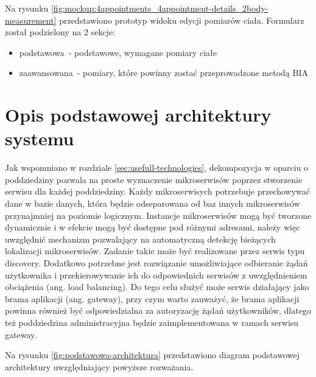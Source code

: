 


Na rysunku \ref{fig:mockup:4appointments_4appointment-details_2body-measurement} przedstawiono prototyp widoku edycji pomiarów ciała.
Formularz został podzielony na 2 sekcje:
\begin{itemize}
    \item podstawowa~- podstawowe, wymagane pomiary ciałe
    \item zaawansowana~- pomiary, które powinny zostać przeprowadzone metodą BIA
\end{itemize}



\section{Opis podstawowej architektury systemu}\label{sec:basicArchitecture}

Jak wspomniano w rozdziale \ref{sec:usefull-technologies}, dekompozycja w oparciu o poddziedziny
pozwala na proste wyznaczenie mikroserwisów poprzez stworzenie serwisu dla każdej poddziedziny.
Każdy mikroserwisych potrzebuje przechowywać dane w bazie danych, która będzie odseparowana od baz innych mikroserwisów przynajmniej na poziomie logicznym.
Instancje mikroserwisów mogą być tworzone dynamicznie i w efekcie mogą być dostępne pod różnymi adresami,
należy więc uwzględnić mechanizm pozwalający na automatyczną detekcję bieżących lokalizacji mikroserwisów.
Zadanie takie może być realizowane przez serwis typu discovery.
Dodatkowo potrzebne jest rozwiązanie umożliwiające odbieranie żądań użytkownika i przekierowywanie ich do odpowiednich serwisów z uwzględnieniem obciążenia (ang. load balancing).
Do tego celu służyć może serwis działający jako brama aplikacji (ang. gateway), przy czym warto zauważyć, że brama aplikacji powinna również być odpowiedzialna za autoryzację żądań użytkowników,
dlatego też poddziedzina administracyjna będzie zaimplementowana w ramach serwisu gateway.
\par
Na rysunku \ref{fig:podstawowa-architektura} przedstawiono diagram podstawowej architektury uwzględniający powyższe rozważania.

